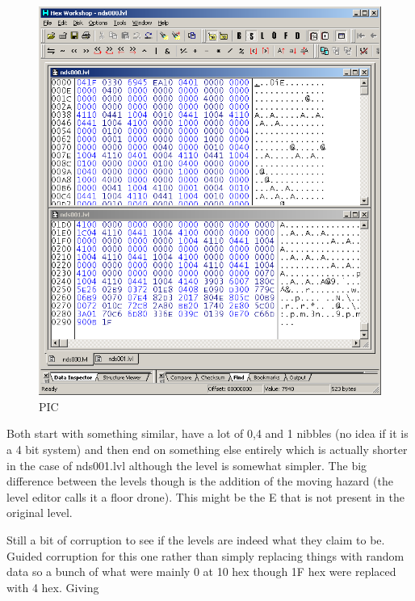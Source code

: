 \documentclass[
]{book}
\begin{document}
\begin{figure}
\centering
\includegraphics{images/170_home_fast6191_romhackingguide_unrenamed_fil___ers_romhackingguideleveleditingworkedNplus3.png}
\caption{PIC}
\end{figure}

Both start with something similar, have a lot of 0,4 and 1 nibbles (no idea if it is a 4 bit system) and then end on something else entirely which is actually shorter in the case of nds001.lvl although the level is somewhat simpler. The big difference between the levels though is the addition of the moving hazard (the level editor calls it a floor drone). This might be the E that is not present in the original level.

Still a bit of corruption to see if the levels are indeed what they claim to be. Guided corruption for this one rather than simply replacing things with random data so a bunch of what were mainly 0 at 10 hex though 1F hex were replaced with 4 hex. Giving
\end{document}

